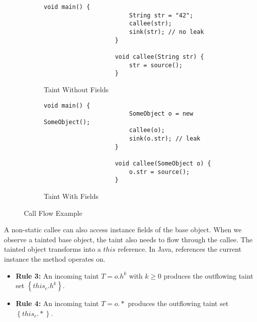 \documentclass[../draft.tex]{subfiles}
\begin{document}
    \begin{figure}[tbp]
        \centering
        \begin{subfigure}[b]{0.45\textwidth}
            \centering
            \begin{adjustbox}{max width=\columnwidth}
                \begin{lstlisting}[gobble=20]
                    void main() {
                        String str = "42";
                        callee(str);
                        sink(str); // no leak
                    }

                    void callee(String str) {
                        str = source();
                    }
                \end{lstlisting}
            \end{adjustbox}
            \caption{Taint Without Fields}
        \end{subfigure}
        \qquad
        \begin{subfigure}[b]{0.45\textwidth}
            \centering
            \begin{adjustbox}{max width=\columnwidth}
                \begin{lstlisting}[gobble=20]
                    void main() {
                        SomeObject o = new SomeObject();
                        callee(o);
                        sink(o.str); // leak
                    }

                    void callee(SomeObject o) {
                        o.str = source();
                    }
                \end{lstlisting}
            \end{adjustbox}
            \caption{Taint With Fields}
        \end{subfigure}
        \caption{Call Flow Example}
        \label{lst:primret}
    \end{figure}

    A non-static callee can also access instance fields of the base object.
    When we observe a tainted base object, the taint also needs to flow through the callee.
    The tainted object transforms into a $\mathit{this}$ reference.
    In Java,  references the current instance the method operates on.
    \begin{itemize}
        \item[] \textbf{Rule 3:} An incoming taint $T=o.h^k$ with $k \geq 0$ produces the outflowing taint set $\left\{\mathit{this}_c.h^k\right\}$.
        \item[] \textbf{Rule 4:} An incoming taint $T=o.*$ produces the outflowing taint set $\left\{\mathit{this}_c.*\right\}$.
    \end{itemize}
\end{document}
